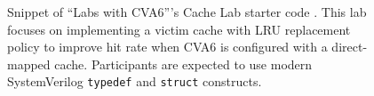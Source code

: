 
\begin{figure}[t]
    \centering
    \begin{minipage}{0.8\textwidth}
        \small
        \inputminted[frame=single,]{SystemVerilog}{media/code/cache_lab/cache.svh}
    \end{minipage}
    \caption[
        Caching Lab starter code snippet
    ]{
        Snippet of \enquote{Labs with CVA6}'s Cache Lab starter code \cite{labsWithCVA6}.
        This lab focuses on implementing a victim cache with LRU replacement policy to improve hit rate when CVA6 is configured with a direct-mapped cache.
        Participants are expected to use modern SystemVerilog \texttt{typedef} and \texttt{struct} constructs.
    }
    \label{fig:cache_lab}
\end{figure}
